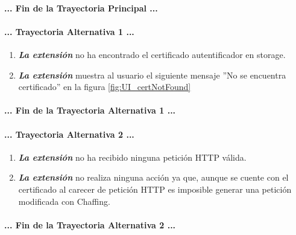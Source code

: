 \documentclass[12pt, a4paper, titlepage]{report}
\begin{document}
				\paragraph{... Fin de la Trayectoria Principal ...}
				
				\paragraph{... Trayectoria Alternativa 1 ...}
				\begin{enumerate}
				    \item \textbf{\textit{La extensión}} no ha encontrado el certificado autentificador en storage.
					\item \textbf{\textit{La extensión}} muestra al usuario el siguiente mensaje ''No se encuentra certificado'' en la figura \ref{fig:UI_certNotFound}
				\end{enumerate}
				\paragraph{... Fin de la Trayectoria Alternativa 1 ...}
				
					\paragraph{... Trayectoria Alternativa 2 ...}
				\begin{enumerate}
				    \item \textbf{\textit{La extensión}} no ha recibido ninguna petición HTTP válida.
					\item \textbf{\textit{La extensión}} no realiza ninguna acción ya que, aunque se cuente con el certificado al carecer de petición HTTP es imposible generar una petición modificada con Chaffing.
				\end{enumerate}
				\paragraph{... Fin de la Trayectoria Alternativa 2 ...}
				
				\newpage
			
\end{document}
